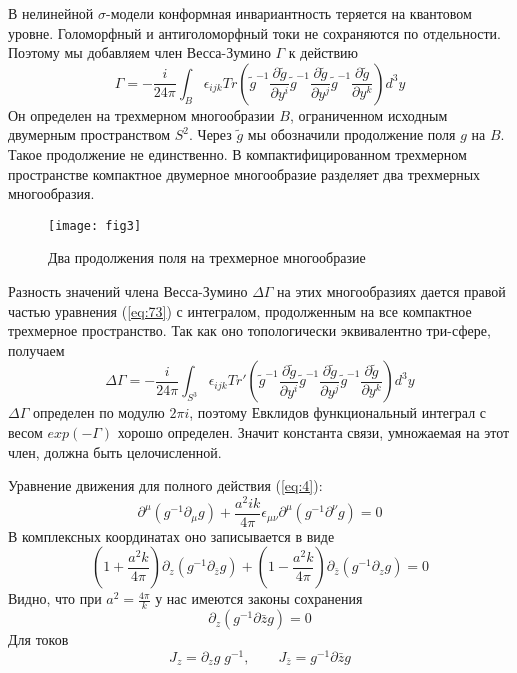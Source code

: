 В нелинейной $\sigma$-модели конформная инвариантность теряется на квантовом уровне.
Голоморфный и антиголоморфный токи не сохраняются по отдельности.
Поэтому мы добавляем член Весса-Зумино $\Gamma$ к действию
\begin{equation}
  \label{eq:73}
\Gamma= - \frac{i }{24\pi} \int_{B}\epsilon_{ijk} Tr\left(
    \tilde g^{-1}\frac{\partial \tilde g}{\partial y^i}
      \tilde g^{-1}\frac{\partial \tilde g}{\partial y^j}
      \tilde g^{-1}\frac{\partial \tilde g}{\partial y^k}\right) d^3y
\end{equation}
Он определен на трехмерном многообразии $B$, ограниченном исходным двумерным пространством $S^{2}$.
Через $\tilde{g}$ мы обозначили продолжение поля $g$ на $B$. Такое продолжение не единственно. В
компактифицированном трехмерном пространстве компактное двумерное многообразие разделяет два
трехмерных многообразия.
\begin{figure}[h]
 \centering
  \texttt{[image: fig3]}  
  \caption{Два продолжения поля на трехмерное многообразие}
  \label{fig:1}
\end{figure}

Разность значений члена Весса-Зумино $\Delta\Gamma$ на этих многообразиях
дается правой частью уравнения (\ref{eq:73}) с интегралом, продолженным на все компактное трехмерное
пространство. Так как оно топологически эквивалентно три-сфере, получаем
\begin{equation}
  \label{eq:75} \Delta\Gamma= - \frac{i }{24\pi} \int_{S^3}\epsilon_{ijk} Tr'\left( \tilde
g^{-1}\frac{\partial \tilde g}{\partial y^i} \tilde g^{-1}\frac{\partial \tilde g}{\partial y^j}
\tilde g^{-1}\frac{\partial \tilde g}{\partial y^k}\right) d^3y
\end{equation}
$\Delta\Gamma$ определен по модулю $2\pi i$, поэтому Евклидов функциональный интеграл
с весом $exp(-\Gamma)$ хорошо определен. Значит константа связи, умножаемая на этот член, должна
быть целочисленной.

Уравнение движения для полного действия (\ref{eq:4}):
\begin{equation}
  \label{eq:77}
  \partial^{\mu}(g^{-1}\partial_{\mu}g)+\frac{a^2 ik}{4\pi}\epsilon_{\mu\nu}\partial^{\mu}(g^{-1}\partial^{\nu}g)=0
\end{equation}
В комплексных координатах оно записывается в виде
\begin{equation}
  \label{eq:78}
  (1+\frac{a^2 k}{4\pi})\partial_z(g^{-1}\partial_{\bar z}g)+(1-\frac{a^2 k}{4\pi})\partial_{\bar z}(g^{-1}\partial_z g)=0
\end{equation}
Видно, что при $a^2=\frac{4\pi}{k}$ у нас имеются законы сохранения
\begin{equation}
  \label{eq:79}
  \partial_z(g^{-1}\partial{\bar z}g)=0
\end{equation}
Для токов
\begin{equation}
  \label{eq:72}
  J_z=\partial_z g\;g^{-1}, \qquad J_{\bar{z}}=g^{-1}\partial{\bar z}g
\end{equation}

